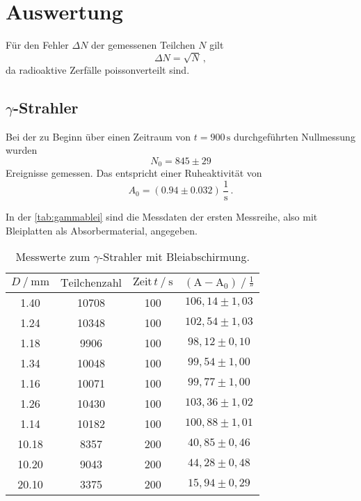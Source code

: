 \section{Auswertung}
\label{sec:Auswertung}
Für den Fehler $\Delta N$ der gemessenen Teilchen $N$ gilt
\begin{equation*}
    \Delta N = \sqrt{N} \,,
\end{equation*}
da radioaktive Zerfälle poissonverteilt sind.

\subsection{$\gamma$-Strahler}

Bei der zu Beginn über einen Zeitraum von $t = 900 \,\unit{\second}$ durchgeführten Nullmessung wurden
\begin{equation*}
    N_0  = 845 \pm 29
\end{equation*}
Ereignisse gemessen.
Das entspricht einer Ruheaktivität von
\begin{equation*}
    A_0 = (0.94 \pm 0.032) \,\dfrac{1}{\unit{\second}} \, .
\end{equation*}

In der \autoref{tab:gammablei} sind die Messdaten der ersten Messreihe, also mit Bleiplatten als Absorbermaterial, angegeben.
\begin{table}[H]
    \centering
    \caption{Messwerte zum $\gamma$-Strahler mit Bleiabschirmung.}
    \label{tab:gammablei}
    \begin{tabular}{S[table-format=2.2] S[table-format=5.0] S[table-format=3.0] S}
      \toprule
      {$D \mathbin{/} \unit{\milli\meter} $} & {$\text{Teilchenzahl}$} & {$\text{Zeit} \,t \mathbin{/} \unit{\second}$} &{$ \left(\text{A}- \text{A}_0 \right) \mathbin{/} \unit{\frac{1}{\second}}$} \\
         & 10708  & 100 & {$106,14   \pm 1,03$}  \\
       1.24  & 10348  & 100 & {$102,54   \pm 1,03$}  \\
       1.18  &  9906  & 100 & {$ 98,12   \pm 0,10$}  \\
       1.34  & 10048  & 100 & {$ 99,54   \pm 1,00$}  \\
       1.16  & 10071  & 100 & {$ 99,77   \pm 1,00$}  \\
       1.26  & 10430  & 100 & {$103,36   \pm 1,02$}  \\
       1.14  & 10182  & 100 & {$100,88   \pm 1,01$}  \\
      10.18  &  8357  & 200 & {$ 40,85   \pm 0,46$}  \\
      10.20  &  9043  & 200 & {$ 44,28   \pm 0,48$}  \\
      20.10  &  3375  & 200 & {$ 15,94   \pm 0,29$}  \\
      \bottomrule
    \end{tabular}
  \end{table}

